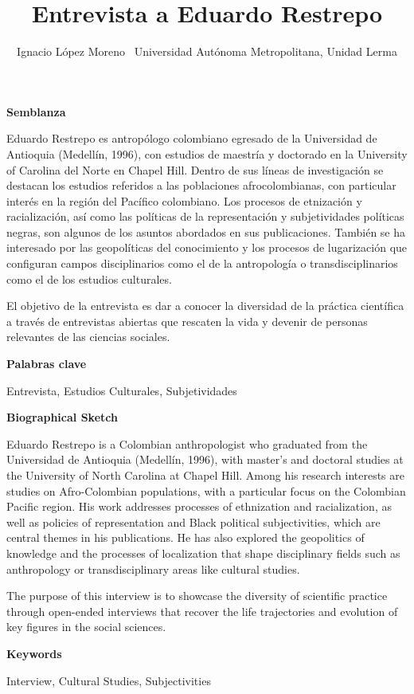 \documentclass[
]{interact}
\title{Entrevista a Eduardo Restrepo}
\author{Ignacio López Moreno \bullet\ 
Universidad Autónoma Metropolitana, Unidad Lerma}
\begin{document}
\captionsetup{labelsep=space}
\maketitle


\newcommand{\articuloTitulo}{Entrevista a Eduardo Restrepo}

\begin{footnotesize}
\textbf{Semblanza}

Eduardo Restrepo es antropólogo colombiano egresado de la Universidad de Antioquia (Medellín, 1996), con estudios de maestría y doctorado en la University of Carolina del Norte en Chapel Hill. Dentro de sus líneas de investigación se destacan los estudios referidos a las poblaciones afrocolombianas, con particular interés en la región del Pacífico colombiano. Los procesos de etnización y racialización, así como las políticas de la representación y subjetividades políticas negras, son algunos de los asuntos abordados en sus publicaciones. También se ha interesado por las geopolíticas del conocimiento y los procesos de lugarización que configuran campos disciplinarios como el de la antropología o transdisciplinarios como el de los estudios culturales.

El objetivo de la entrevista es dar a conocer la diversidad de la práctica científica a través de entrevistas abiertas que rescaten la vida y devenir de personas relevantes de las ciencias sociales.

\textbf{Palabras clave}

Entrevista, Estudios Culturales, Subjetividades
\end{footnotesize}

\newpage

\begin{footnotesize}
\textbf{Biographical Sketch}

Eduardo Restrepo is a Colombian anthropologist who graduated from the Universidad de Antioquia (Medellín, 1996), with master’s and doctoral studies at the University of North Carolina at Chapel Hill. Among his research interests are studies on Afro-Colombian populations, with a particular focus on the Colombian Pacific region. His work addresses processes of ethnization and racialization, as well as policies of representation and Black political subjectivities, which are central themes in his publications. He has also explored the geopolitics of knowledge and the processes of localization that shape disciplinary fields such as anthropology or transdisciplinary areas like cultural studies.

The purpose of this interview is to showcase the diversity of scientific practice through open-ended interviews that recover the life trajectories and evolution of key figures in the social sciences.

\textbf{Keywords}

Interview, Cultural Studies, Subjectivities
\end{footnotesize}
\end{document}
